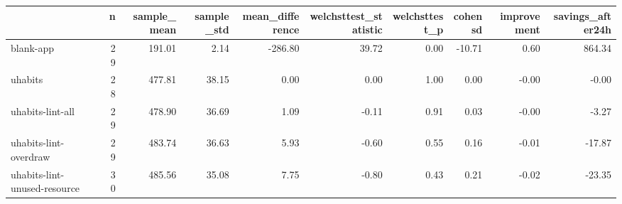 \begin{tabular}{lrrrrrrrrr}
\toprule
{} &   n &  sample\_mean &  sample\_std &  mean\_difference &  welchsttest\_statistic &  welchsttest\_p &  cohensd &  improvement &  savings\_after24h \\
\midrule
blank-app                    &  29 &       191.01 &        2.14 &          -286.80 &                  39.72 &           0.00 &   -10.71 &         0.60 &            864.34 \\
uhabits                      &  28 &       477.81 &       38.15 &             0.00 &                   0.00 &           1.00 &     0.00 &        -0.00 &             -0.00 \\
uhabits-lint-all             &  29 &       478.90 &       36.69 &             1.09 &                  -0.11 &           0.91 &     0.03 &        -0.00 &             -3.27 \\
uhabits-lint-overdraw        &  29 &       483.74 &       36.63 &             5.93 &                  -0.60 &           0.55 &     0.16 &        -0.01 &            -17.87 \\
uhabits-lint-unused-resource &  30 &       485.56 &       35.08 &             7.75 &                  -0.80 &           0.43 &     0.21 &        -0.02 &            -23.35 \\
\bottomrule
\end{tabular}
